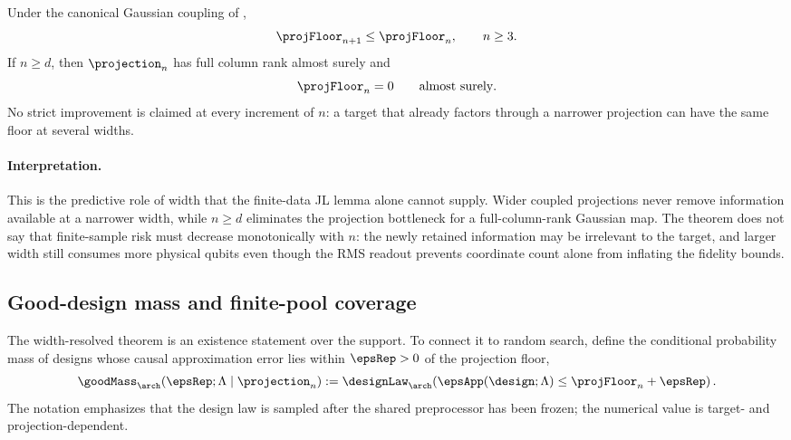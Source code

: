 \begin{corollary}
\label{cor:width-information-monotonicity}
Under the canonical Gaussian coupling of ,
\begin{equation}
    \projFloor_{n+1}\leq\projFloor_n,
    \qquad n\geq3.
    \label{eq:width-floor-monotonicity}
\end{equation}
If $n\geq d$, then $\projection_n$ has full column rank almost surely and
\begin{equation}
    \projFloor_n=0
    \qquad\text{almost surely}.
    \label{eq:width-floor-zero}
\end{equation}
No strict improvement is claimed at every increment of $n$: a target that
already factors through a narrower projection can have the same floor at
several widths.
\end{corollary}

\paragraph{Interpretation.}
This is the predictive role of width that the finite-data JL lemma alone cannot
supply.  Wider coupled projections never remove information available at a
narrower width, while $n\geq d$ eliminates the projection bottleneck for a
full-column-rank Gaussian map.  The theorem does not say that finite-sample
risk must decrease monotonically with $n$: the newly retained information may
be irrelevant to the target, and larger width still consumes more physical
qubits even though the RMS readout prevents coordinate count alone from
inflating the fidelity bounds.

\subsection{Good-design mass and finite-pool coverage}
\label{sec:pool-coverage}

The width-resolved theorem is an existence statement over the support.  To
connect it to random search, define the conditional probability mass of designs
whose causal approximation error lies within $\epsRep>0$ of the projection
floor,
\begin{equation}
    \goodMass_{\arch}(\epsRep;\Lambda\mid\projection_n)
    :=\designLaw_{\arch}\!\left(
       \epsApp(\design;\Lambda)
       \leq\projFloor_n+\epsRep
      \right).
    \label{eq:good-design-mass}
\end{equation}
The notation emphasizes that the design law is sampled after the shared
preprocessor has been frozen; the numerical value is target- and
projection-dependent.

